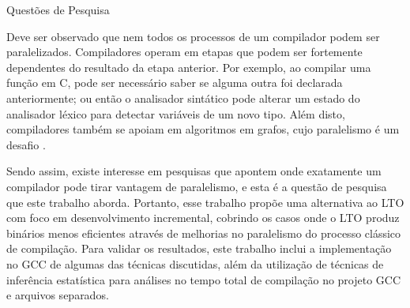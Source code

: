 \begin{subsection}{Questões de Pesquisa}

Deve ser observado que nem todos os processos de um compilador podem ser
paralelizados. Compiladores operam em etapas que podem ser fortemente
dependentes do resultado da etapa anterior. Por exemplo, ao compilar uma
função em C, pode ser necessário saber se alguma outra foi declarada anteriormente; ou
então o analisador sintático pode alterar um estado do analisador léxico para
detectar variáveis de um novo tipo. Além disto, compiladores também se apoiam em algoritmos
em grafos, cujo paralelismo é um desafio \citep{lumsdaine2007challenges}.

Sendo assim, existe interesse em pesquisas que apontem onde exatamente um compilador
pode tirar vantagem de paralelismo, e esta é a questão de pesquisa que este
trabalho aborda. Portanto, esse trabalho propõe uma alternativa ao LTO com foco
em desenvolvimento incremental, cobrindo os casos onde o LTO produz binários menos
eficientes através de melhorias no paralelismo do processo clássico de compilação.
Para validar os resultados, este trabalho inclui a implementação no GCC de algumas das
técnicas discutidas, além da utilização de técnicas de inferência estatística para
análises no tempo total de compilação no projeto GCC e arquivos separados.

\end{subsection}

